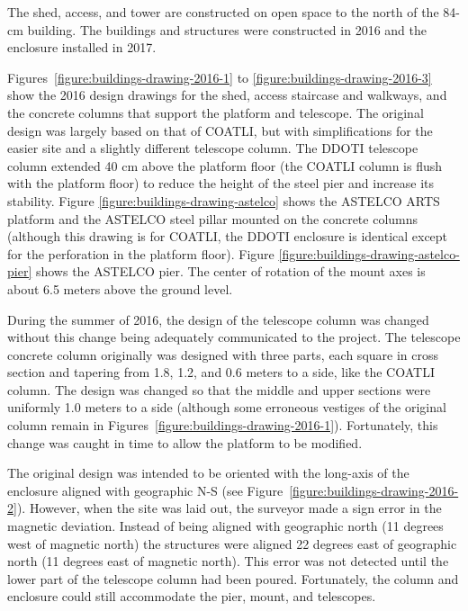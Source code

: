 \ifddotioan

The shed, access, and tower are constructed on open space to the north of the 84-cm building. The buildings and structures were constructed in 2016 and the enclosure installed in 2017.

Figures~\ref{figure:buildings-drawing-2016-1} to \ref{figure:buildings-drawing-2016-3} show the 2016 design drawings for the shed, access staircase and walkways, and the concrete columns that support the platform and telescope. The original design was largely based on that of COATLI, but with simplifications for the easier site and a slightly different telescope column. The DDOTI telescope column extended 40 cm above the platform floor (the COATLI column is flush with the platform floor) to reduce the height of the steel pier and increase its stability. Figure  \ref{figure:buildings-drawing-astelco} shows the ASTELCO ARTS platform and the ASTELCO steel pillar mounted on the concrete columns (although this drawing is for COATLI, the DDOTI enclosure is identical except for the perforation in the platform floor). Figure  \ref{figure:buildings-drawing-astelco-pier} shows the ASTELCO pier. The center of rotation of the mount axes is about 6.5 meters above the ground level.

During the summer of 2016, the design of the telescope column was changed without this change being adequately communicated to the project. The telescope concrete column  originally was designed with three parts, each square in cross section and tapering from 1.8, 1.2, and 0.6 meters to a side, like the COATLI column. The design was changed so that the middle and upper sections were uniformly 1.0 meters to a side (although some erroneous vestiges of the original column remain in Figures~\ref{figure:buildings-drawing-2016-1}). Fortunately, this change was caught in time to allow the platform to be modified.

The original design was intended to be oriented with the long-axis of the enclosure aligned with geographic N-S (see Figure~\ref{figure:buildings-drawing-2016-2}). However, when the site was laid out, the surveyor made a sign error in the magnetic deviation. Instead of being aligned with geographic north (11 degrees west of magnetic north) the structures were aligned 22 degrees east of geographic north (11 degrees east of magnetic north). This error was not detected until the lower part of the telescope column had been poured. Fortunately, the column and enclosure could still accommodate the pier, mount, and telescopes.

